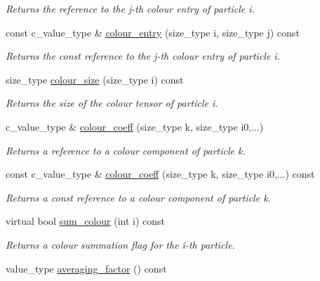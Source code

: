 \begin{DoxyCompactItemize}
\begin{DoxyCompactList}\small\item\em Returns the reference to the j-\/th colour entry of particle i. \end{DoxyCompactList}\item 
\hypertarget{a00079_a92c40b47bb12145a8b61fb95064745cf}{}const c\+\_\+value\+\_\+type \& \hyperlink{a00079_a92c40b47bb12145a8b61fb95064745cf}{colour\+\_\+entry} (size\+\_\+type i, size\+\_\+type j) const \label{a00079_a92c40b47bb12145a8b61fb95064745cf}

\begin{DoxyCompactList}\small\item\em Returns the const reference to the j-\/th colour entry of particle i. \end{DoxyCompactList}\item 
\hypertarget{a00079_a65b02dcdd0beaab6882e9dbc6a848e43}{}size\+\_\+type \hyperlink{a00079_a65b02dcdd0beaab6882e9dbc6a848e43}{colour\+\_\+size} (size\+\_\+type i) const \label{a00079_a65b02dcdd0beaab6882e9dbc6a848e43}

\begin{DoxyCompactList}\small\item\em Returns the size of the colour tensor of particle i. \end{DoxyCompactList}\item 
\hypertarget{a00079_a8c3b86399c95c133ff909802e41774b0}{}c\+\_\+value\+\_\+type \& \hyperlink{a00079_a8c3b86399c95c133ff909802e41774b0}{colour\+\_\+coeff} (size\+\_\+type k, size\+\_\+type i0,...)\label{a00079_a8c3b86399c95c133ff909802e41774b0}

\begin{DoxyCompactList}\small\item\em Returns a reference to a colour component of particle k. \end{DoxyCompactList}\item 
\hypertarget{a00079_ad6909f5a1a768a62059fae53662bd33f}{}const c\+\_\+value\+\_\+type \& \hyperlink{a00079_ad6909f5a1a768a62059fae53662bd33f}{colour\+\_\+coeff} (size\+\_\+type k, size\+\_\+type i0,...) const \label{a00079_ad6909f5a1a768a62059fae53662bd33f}

\begin{DoxyCompactList}\small\item\em Returns a const reference to a colour component of particle k. \end{DoxyCompactList}\item 
virtual bool \hyperlink{a00079_afdc838af727810436248bc8e015910c1}{sum\+\_\+colour} (int i) const 
\begin{DoxyCompactList}\small\item\em Returns a colour summation flag for the i-\/th particle. \end{DoxyCompactList}\item 
\hypertarget{a00079_aa2740b4de29eb18a9056cdfe345bddcd}{}value\+\_\+type \hyperlink{a00079_aa2740b4de29eb18a9056cdfe345bddcd}{averaging\+\_\+factor} () const \label{a00079_aa2740b4de29eb18a9056cdfe345bddcd}


\end{DoxyCompactItemize}
